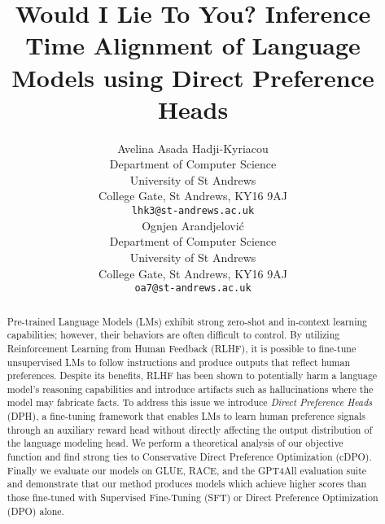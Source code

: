 \documentclass{article}
\title{Would I Lie To You? Inference Time Alignment of Language Models using Direct Preference Heads}
\author{%
  Avelina Asada Hadji-Kyriacou \\
  Department of Computer Science \\
  University of St Andrews \\
  College Gate, St Andrews, KY16 9AJ \\
  \texttt{lhk3@st-andrews.ac.uk} \\
  \And
  Ognjen Arandjelović \\
  Department of Computer Science \\
  University of St Andrews \\
  College Gate, St Andrews, KY16 9AJ \\
  \texttt{oa7@st-andrews.ac.uk} \\
}
\newcommand{\todo}[1]{{\color{red}#1}}
\begin{document}
\maketitle

\newtheorem{theorem}{Theorem}

\begin{abstract}
Pre-trained Language Models (LMs) exhibit strong zero-shot and in-context learning capabilities; however, their behaviors are often difficult to control. By utilizing Reinforcement Learning from Human Feedback (RLHF), it is possible to fine-tune unsupervised LMs to follow instructions and produce outputs that reflect human preferences. Despite its benefits, RLHF has been shown to potentially harm a language model's reasoning capabilities and introduce artifacts such as hallucinations where the model may fabricate facts. To address this issue we introduce \textit{Direct Preference Heads} (DPH), a fine-tuning framework that enables LMs to learn human preference signals through an auxiliary reward head without directly affecting the output distribution of the language modeling head. We perform a theoretical analysis of our objective function and find strong ties to Conservative Direct Preference Optimization (cDPO). Finally we evaluate our models on GLUE, RACE, and the GPT4All evaluation suite and demonstrate that our method produces models which achieve higher scores than those fine-tuned with Supervised Fine-Tuning (SFT) or Direct Preference Optimization (DPO) alone.
\end{abstract}








\begin{ack}
\end{ack}

{
    \small
    
    
}





% 
\end{document}
